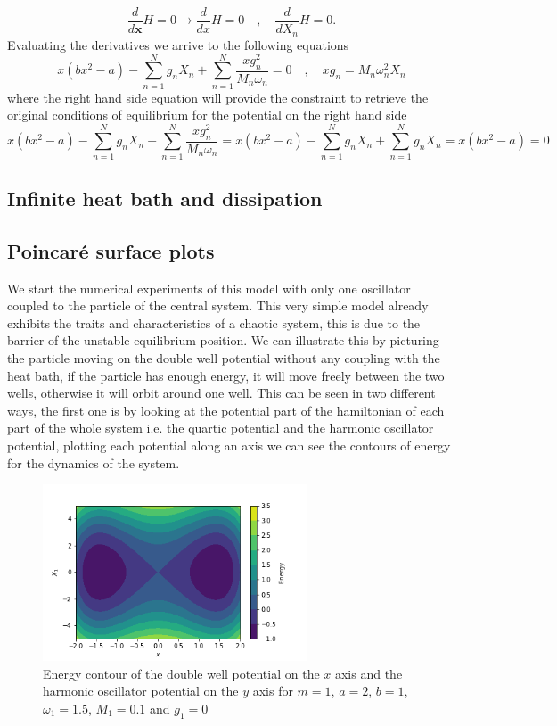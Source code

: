 \begin{equation}
\frac{d}{d\textbf{x}}H=0\rightarrow \frac{d}{dx}H =0 \quad , \quad \frac{d}{dX_n}H  = 0.
\end{equation}
Evaluating the derivatives we arrive to the following equations
\begin{equation}
x(bx^2-a)-\sum_{n=1}^N g_n X_n +\sum_{n=1}^N \frac{xg_n^2}{M_n\omega_n}=0 \quad , \quad xg_n=M_n\omega_n^2 X_n 
\end{equation}
where the right hand side equation will provide the constraint to retrieve the original conditions of equilibrium for the potential on the right hand side
\begin{equation}
x(bx^2-a)-\sum_{n=1}^N g_n X_n +\sum_{n=1}^N \frac{xg_n^2}{M_n\omega_n}= x(bx^2-a)-\sum_{n=1}^N g_n X_n +\sum_{n=1}^N g_n X_n=x(bx^2-a)=0
\end{equation}

\subsection{Infinite heat bath and dissipation}



\subsection{Poincaré surface plots}
We start the numerical experiments of this model with only one oscillator coupled to the particle of the central system. This very simple model already exhibits the traits and characteristics of a chaotic system, this is due to the barrier of the unstable equilibrium position. We can illustrate this by picturing the particle moving on the double well potential without any coupling with the heat bath, if the particle has enough energy, it will move freely between the two wells, otherwise it will orbit around one well. This can be seen in two different ways, the first one is by looking at the potential part of the hamiltonian of each part of the whole system i.e. the quartic potential and the harmonic oscillator potential, plotting each potential along an axis we can see the contours of energy for the dynamics of the system.

\begin{figure}[H]
\centering
\includegraphics[width=0.7\textwidth]{Figures/energy_contour.png}
\caption{Energy contour of the double well potential on the $x$ axis and the harmonic oscillator potential on the $y$ axis for $m=1$, $a=2$, $b=1$, $\omega_1=1.5$, $M_1=0.1$ and $g_1=0$\label{fig:contour_g0}}

\end{figure}

